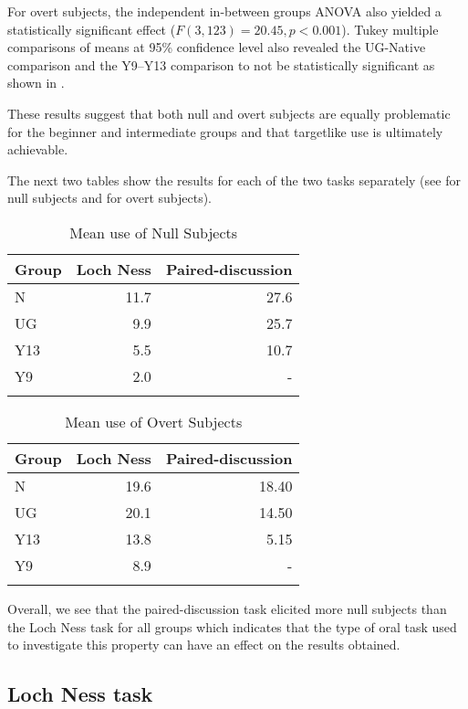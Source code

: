 \documentclass[output=paper]{langscibook}
\begin{document}
For overt subjects, the independent in-between groups ANOVA also yielded a statistically significant effect ($F (3,123) = 20.45,\allowbreak p <0.001$). Tukey multiple comparisons of means at 95\% confidence level also revealed the UG-Native comparison and the Y9–Y13 comparison to not be statistically significant as shown in .


These results suggest that both null and overt subjects are equally problematic for the beginner and intermediate groups and that targetlike use is ultimately achievable.

The next two tables show the results for each of the two tasks separately (see  for null subjects and  for overt subjects).

\begin{table}
\caption{Mean use of Null Subjects\label{tab:dominguez:6}}
\begin{tabular}{lrr}
\lsptoprule
Group & Loch Ness & Paired-discussion\\\midrule
N & 11.7 & 27.6\\
UG & 9.9 & 25.7\\
Y13 & 5.5 & 10.7\\
Y9 & 2.0 & {}-\\
\lspbottomrule
\end{tabular}
\end{table}

\begin{table}
\caption{\label{tab:dominguez:7}Mean use of Overt Subjects}
\begin{tabular}{lrr}
\lsptoprule
Group & Loch Ness & Paired-discussion\\\midrule
N & 19.6 & 18.40\\
UG & 20.1 & 14.50\\
Y13 & 13.8 & 5.15\\
Y9 & 8.9 & {}-\\
\lspbottomrule
\end{tabular}
\end{table}

Overall, we see that the paired-discussion task elicited more null subjects than the Loch Ness task for all groups which indicates that the type of oral task used to investigate this property can have an effect on the results obtained.

\subsection{Loch Ness task}
\end{document}
